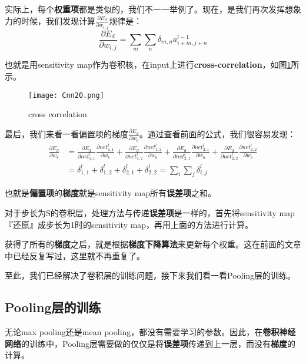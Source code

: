 实际上，每个\textbf{权重项}都是类似的，我们不一一举例了。现在，是我们再次发挥想象力的时候，我们发现计算\(\frac{\partial{E_d}}{\partial{w_{i,j}}}\)规律是：
\[
	\frac{\partial{E_d}}{\partial{w_{i,j}}}=\sum_m\sum_n\delta_{m,n}a^{l-1}_{i+m,j+n}
\]

也就是用sensitivity map作为卷积核，在input上进行\textbf{cross-correlation}，如图\ref{fig:Cnn20}所示。

\begin{figure}[h]
	\centering
	\texttt{[image: Cnn20.png]}
	\caption{cross correlation}
	\label{fig:Cnn20}
\end{figure}

最后，我们来看一看偏置项的梯度\(\frac{\partial{E_d}}{\partial{w_b}}\)。通过查看前面的公式，我们很容易发现：
\begin{align*}
	\frac{\partial{E_d}}{\partial{w_b}} & =\frac{\partial{E_d}}{\partial{net^{l}_{1,1}}}\frac{\partial{net^{l}_{1,1}}}{\partial{w_b}}+\frac{\partial{E_d}}{\partial{net^{l}_{1,2}}}\frac{\partial{net^{l}_{1,2}}}{\partial{w_b}}+\frac{\partial{E_d}}{\partial{net^{l}_{2,1}}}\frac{\partial{net^{l}_{2,1}}}{\partial{w_b}}+\frac{\partial{E_d}}{\partial{net^{l}_{2,2}}}\frac{\partial{net^{l}_{2,2}}}{\partial{w_b}} \\
	                                    & =\delta^l_{1,1}+\delta^l_{1,2}+\delta^l_{2,1}+\delta^l_{2,2}=\sum_i\sum_j\delta^l_{i,j}
\end{align*}


也就是\textbf{偏置项}的\textbf{梯度}就是sensitivity map所有\textbf{误差项}之和。

对于步长为S的卷积层，处理方法与传递\textbf{误差项}是一样的，首先将sensitivity map『还原』成步长为1时的sensitivity map，再用上面的方法进行计算。

获得了所有的\textbf{梯度}之后，就是根据\textbf{梯度下降算法}来更新每个权重。这在前面的文章中已经反复写过，这里就不再重复了。

至此，我们已经解决了卷积层的训练问题，接下来我们看一看Pooling层的训练。



\subsection{Pooling层的训练}\label{Cnn:9}

无论max pooling还是mean
pooling，都没有需要学习的参数。因此，在\textbf{卷积神经网络}的训练中，Pooling层需要做的仅仅是将\textbf{误差项}传递到上一层，而没有\textbf{梯度}的计算。

